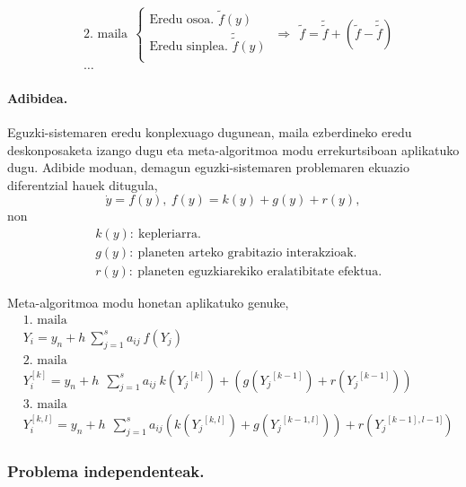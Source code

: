 \begin{align*}
&\mbox{2. maila} \ \
\left \{ \begin{array}{c}
  \mbox{Eredu osoa.   }\tilde{f}(y) \\[.25cm]
  \mbox{Eredu sinplea.    }\tilde{\tilde{f}}(y)  \\
\end{array} \right.
\ \Rightarrow \ \
\tilde{f} =\tilde{\tilde{f}}+({\tilde{f}}-\tilde{\tilde{f}})\\
&\dots  
\end{align*}

\paragraph*{Adibidea.}
Eguzki-sistemaren eredu konplexuago dugunean, maila ezberdineko eredu deskonposaketa izango dugu eta  meta-algoritmoa modu errekurtsiboan aplikatuko dugu. Adibide moduan, demagun eguzki-sistemaren problemaren ekuazio diferentzial hauek ditugula,
\begin{equation*}
\dot{y}=f(y), \ f(y)=k(y)+g(y)+r(y),
\end{equation*}
non
\begin{align*}
&k(y): \ \text{kepleriarra.}\\
&g(y): \ \text{planeten arteko grabitazio interakzioak.}\\
&r(y): \ \text{planeten eguzkiarekiko eralatibitate efektua.}
\end{align*}

Meta-algoritmoa modu honetan aplikatuko genuke,
\begin{align*}
&\mbox{1. maila}\\ 
&Y_i=y_n+h \ \sum^s_{j=1}{a_{ij} \ f(Y_j)} \\
&\mbox{2. maila}\\
&Y_i^{[k]}=y_n+h\ \ \sum^s_{j=1}{a_{ij} \ k({Y_j}^{[k]})+ \left(g({Y_j}^{[k-1]})+r({Y_j}^{[k-1]})\right) }\\
&\mbox{3. maila}\\
&Y_i^{[k,l]}=y_n+h\ \ \sum^s_{j=1}{a_{ij} \left(k({Y_j}^{[k,l]})+g({Y_j}^{[k-1,l]})\right)+r({Y_j}^{[k-1],l-1]})}
\end{align*}

\subsubsection*{Problema independenteak.}

